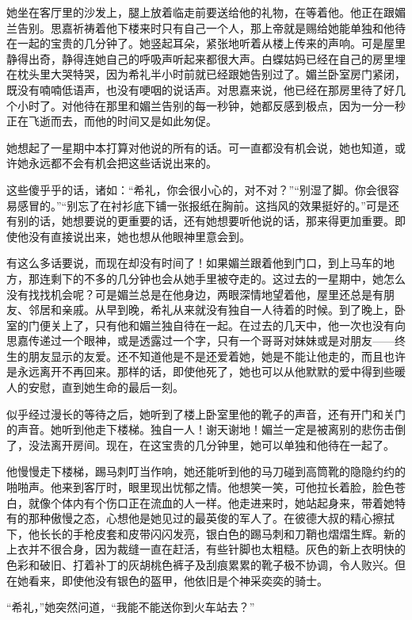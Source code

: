 \par 她坐在客厅里的沙发上，腿上放着临走前要送给他的礼物，在等着他。他正在跟媚兰告别。思嘉祈祷着他下楼来时只有自己一个人，那上帝就是赐给她能单独和他待在一起的宝贵的几分钟了。她竖起耳朵，紧张地听着从楼上传来的声响。可是屋里静得出奇，静得连她自己的呼吸声听起来都很大声。白蝶姑妈已经在自己的房里埋在枕头里大哭特哭，因为希礼半小时前就已经跟她告别过了。媚兰卧室房门紧闭，既没有喃喃低语声，也没有哽咽的说话声。对思嘉来说，他已经在那房里待了好几个小时了。对他待在那里和媚兰告别的每一秒钟，她都反感到极点，因为一分一秒正在飞逝而去，而他的时间又是如此匆促。
\par 她想起了一星期中本打算对他说的所有的话。可一直都没有机会说，她也知道，或许她永远都不会有机会把这些话说出来的。
\par 这些傻乎乎的话，诸如：“希礼，你会很小心的，对不对？”“别湿了脚。你会很容易感冒的。”“别忘了在衬衫底下铺一张报纸在胸前。这挡风的效果挺好的。”可是还有别的话，她想要说的更重要的话，还有她想要听他说的话，那来得更加重要。即使他没有直接说出来，她也想从他眼神里意会到。
\par 有这么多话要说，而现在却没有时间了！如果媚兰跟着他到门口，到上马车的地方，那连剩下的不多的几分钟也会从她手里被夺走的。这过去的一星期中，她怎么没有找找机会呢？可是媚兰总是在他身边，两眼深情地望着他，屋里还总是有朋友、邻居和亲戚。从早到晚，希礼从来就没有独自一人待着的时候。到了晚上，卧室的门便关上了，只有他和媚兰独自待在一起。在过去的几天中，他一次也没有向思嘉传递过一个眼神，或是透露过一个字，只有一个哥哥对妹妹或是对朋友——终生的朋友显示的友爱。还不知道他是不是还爱着她，她是不能让他走的，而且也许是永远离开不再回来。那样的话，即使他死了，她也可以从他默默的爱中得到些暖人的安慰，直到她生命的最后一刻。
\par 似乎经过漫长的等待之后，她听到了楼上卧室里他的靴子的声音，还有开门和关门的声音。她听到他走下楼梯。独自一人！谢天谢地！媚兰一定是被离别的悲伤击倒了，没法离开房间。现在，在这宝贵的几分钟里，她可以单独和他待在一起了。
\par 他慢慢走下楼梯，踢马刺叮当作响，她还能听到他的马刀碰到高筒靴的隐隐约约的啪啪声。他来到客厅时，眼里现出忧郁之情。他想笑一笑，可他拉长着脸，脸色苍白，就像个体内有个伤口正在流血的人一样。他走进来时，她站起身来，带着她特有的那种傲慢之态，心想他是她见过的最英俊的军人了。在彼德大叔的精心擦拭下，他长长的手枪皮套和皮带闪闪发亮，银白色的踢马刺和刀鞘也熠熠生辉。新的上衣并不很合身，因为裁缝一直在赶活，有些针脚也太粗糙。灰色的新上衣明快的色彩和破旧、打着补丁的灰胡桃色裤子及刮痕累累的靴子极不协调，令人败兴。但在她看来，即使他没有银色的盔甲，他依旧是个神采奕奕的骑士。
\par “希礼，”她突然问道，“我能不能送你到火车站去？”

